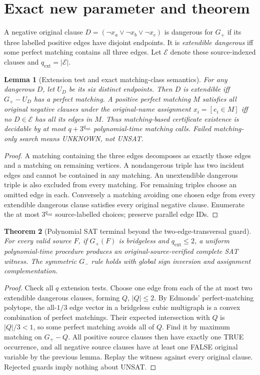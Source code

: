 \documentclass[11pt]{article}
\newtheorem{theorem}{Theorem}
\newtheorem{lemma}[theorem]{Lemma}
\begin{document}
\section{Exact new parameter and theorem}
A negative original clause $D=(\neg x_a\vee\neg x_b\vee\neg x_c)$ is dangerous for $G_+$ if its three labelled positive edges have disjoint endpoints. It is \emph{extendible dangerous} iff some perfect matching contains all three edges. Let $\mathcal E$ denote these source-indexed clauses and $q_{\mathrm{ext}}=|\mathcal E|$.
\begin{lemma}[Extension test and exact matching-class semantics]
For any dangerous $D$, let $U_D$ be its six distinct endpoints. Then $D$ is extendible iff $G_+-U_D$ has a perfect matching. A positive perfect matching $M$ satisfies all original negative clauses under the original-name assignment $x_i=[e_i\in M]$ iff no $D\in\mathcal E$ has all its edges in $M$. Thus matching-based certificate existence is decidable by at most $q+3^{q_{\mathrm{ext}}}$ polynomial-time matching calls. Failed matching-only search means UNKNOWN, not UNSAT.
\end{lemma}
\begin{proof}
A matching containing the three edges decomposes as exactly those edges and a matching on remaining vertices. A nondangerous triple has two incident edges and cannot be contained in any matching. An unextendible dangerous triple is also excluded from every matching. For remaining triples choose an omitted edge in each. Conversely a matching avoiding one chosen edge from every extendible dangerous clause satisfies every original negative clause. Enumerate the at most $3^{q_{\mathrm{ext}}}$ source-labelled choices; preserve parallel edge IDs.
\end{proof}
\begin{theorem}[Polynomial SAT terminal beyond the two-edge-transversal guard]
For every valid source $F$, if $G_+(F)$ is bridgeless and $q_{\mathrm{ext}}\le2$, a uniform polynomial-time procedure produces an original-source-verified complete SAT witness. The symmetric $G_-$ rule holds with global sign inversion and assignment complementation.
\end{theorem}
\begin{proof}
Check all $q$ extension tests. Choose one edge from each of the at most two extendible dangerous clauses, forming $Q$, $|Q|\le2$. By Edmonds' perfect-matching polytope, the all-$1/3$ edge vector in a bridgeless cubic multigraph is a convex combination of perfect matchings. Their expected intersection with $Q$ is $|Q|/3<1$, so some perfect matching avoids all of $Q$. Find it by maximum matching on $G_+-Q$. All positive source clauses then have exactly one TRUE occurrence, and all negative source clauses have at least one FALSE original variable by the previous lemma. Replay the witness against every original clause. Rejected guards imply nothing about UNSAT.
\end{proof}
\end{document}
